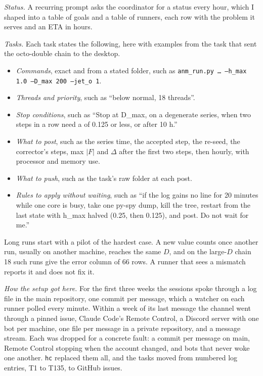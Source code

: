 \documentclass[aps,prd,onecolumn,superscriptaddress,nofootinbib,10pt]{revtex4-2}
\newcommand{\file}[1]{\texttt{#1}}
\begin{document}
\emph{Status.} A recurring prompt asks the coordinator for a status every hour, which I shaped into a table of goals and
a table of runners, each row with the problem it serves and an ETA in hours.

\emph{Tasks.} Each task states the following, here with examples from the task that sent the octo-double chain to the
desktop.
\begin{itemize}
\item \emph{Commands}, exact and from a stated folder, such as \file{anm\_run.py \dots\ --h\_max 1.0 --D\_max 200 --jet\_o 1}.
\item \emph{Threads and priority}, such as ``below normal, 18 threads''.
\item \emph{Stop conditions}, such as ``Stop at D\_max, on a degenerate series, when two steps in a row need a of 0.125 or
less, or after 10 h.''
\item \emph{What to post}, such as the series time, the accepted step, the re-seed, the corrector's steps, max $|F|$ and
$\Delta$ after the first two steps, then hourly, with processor and memory use.
\item \emph{What to push}, such as the task's raw folder at each post.
\item \emph{Rules to apply without waiting}, such as ``if the log gains no line for 20 minutes while one core is busy, take
one py-spy dump, kill the tree, restart from the last state with h\_max halved (0.25, then 0.125), and post. Do not wait
for me.''
\end{itemize}
Long runs start with a pilot of the hardest case. A new value counts once another run, usually on another machine,
reaches the same $D$, and on the large-$D$ chain 18 such runs give the error column of 66 rows. A runner that sees a
mismatch reports it and does not fix it.

\emph{How the setup got here.} For the first three weeks the sessions spoke through a log file in the main repository,
one commit per message, which a watcher on each runner polled every minute. Within a week of its last message the
channel went through a pinned issue, Claude Code's Remote Control, a Discord server with one bot per machine, one file
per message in a private repository, and a message stream. Each was dropped for a concrete fault: a commit per message on
main, Remote Control stopping when the account changed, and bots that never woke one another. \file{hc} replaced them
all, and the tasks moved from numbered log entries, T1 to T135, to GitHub issues.
\end{document}
